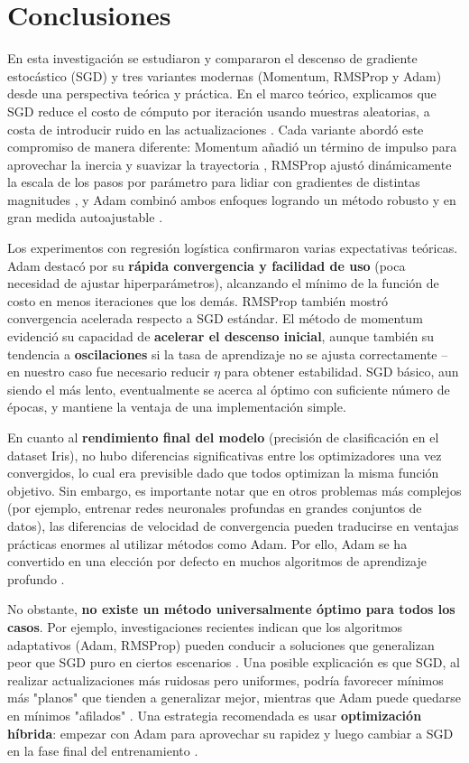 \documentclass[12pt, spanish]{article}
\begin{document}
\section{Conclusiones}
En esta investigación se estudiaron y compararon el descenso de gradiente estocástico (SGD) y tres variantes modernas (Momentum, RMSProp y Adam) desde una perspectiva teórica y práctica. En el marco teórico, explicamos que SGD reduce el costo de cómputo por iteración usando muestras aleatorias, a costa de introducir ruido en las actualizaciones \cite{ref1}. Cada variante abordó este compromiso de manera diferente: Momentum añadió un término de impulso para aprovechar la inercia y suavizar la trayectoria \cite{ref4}, RMSProp ajustó dinámicamente la escala de los pasos por parámetro para lidiar con gradientes de distintas magnitudes \cite{ref3}, y Adam combinó ambos enfoques logrando un método robusto y en gran medida autoajustable \cite{ref2}.

Los experimentos con regresión logística confirmaron varias expectativas teóricas. Adam destacó por su \textbf{rápida convergencia y facilidad de uso} (poca necesidad de ajustar hiperparámetros), alcanzando el mínimo de la función de costo en menos iteraciones que los demás. RMSProp también mostró convergencia acelerada respecto a SGD estándar. El método de momentum evidenció su capacidad de \textbf{acelerar el descenso inicial}, aunque también su tendencia a \textbf{oscilaciones} si la tasa de aprendizaje no se ajusta correctamente – en nuestro caso fue necesario reducir $\eta$ para obtener estabilidad. SGD básico, aun siendo el más lento, eventualmente se acerca al óptimo con suficiente número de épocas, y mantiene la ventaja de una implementación simple.

En cuanto al \textbf{rendimiento final del modelo} (precisión de clasificación en el dataset Iris), no hubo diferencias significativas entre los optimizadores una vez convergidos, lo cual era previsible dado que todos optimizan la misma función objetivo. Sin embargo, es importante notar que en otros problemas más complejos (por ejemplo, entrenar redes neuronales profundas en grandes conjuntos de datos), las diferencias de velocidad de convergencia pueden traducirse en ventajas prácticas enormes al utilizar métodos como Adam. Por ello, Adam se ha convertido en una elección por defecto en muchos algoritmos de aprendizaje profundo \cite{ref2}.

No obstante, \textbf{no existe un método universalmente óptimo para todos los casos}. Por ejemplo, investigaciones recientes indican que los algoritmos adaptativos (Adam, RMSProp) pueden conducir a soluciones que generalizan peor que SGD puro en ciertos escenarios \cite{ref5}. Una posible explicación es que SGD, al realizar actualizaciones más ruidosas pero uniformes, podría favorecer mínimos más "planos" que tienden a generalizar mejor, mientras que Adam puede quedarse en mínimos "afilados" \cite{ref5}. Una estrategia recomendada es usar \textbf{optimización híbrida}: empezar con Adam para aprovechar su rapidez y luego cambiar a SGD en la fase final del entrenamiento \cite{ref5}.
\end{document}
